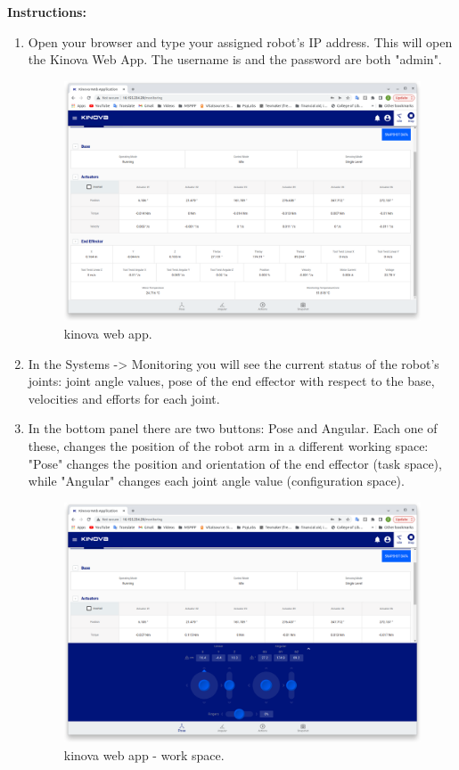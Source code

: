 \documentclass[12pt]{article}
\begin{document}
\textbf{Instructions:}
\begin{enumerate}
    \item Open your browser and type your assigned robot’s IP address. This will open the Kinova Web App. The username is and the password are both "admin". 
    \begin{figure}[H]
    \vspace{-10pt}
    \centering\includegraphics[width=12cm]{images/kinova1.PNG}\vspace{-10pt}
    \caption{kinova web app.}\label{fig:kinova1}
    \end{figure}
    
    \item In the Systems -> Monitoring you will see the current status of the robot’s joints: joint angle values, pose of the end effector with respect to the base, velocities and efforts for each joint.
    \item In the bottom panel there are two buttons: Pose and Angular. Each one of these, changes the position of the robot arm in a different working space: "Pose" changes the position and orientation of the end effector (task space), while "Angular" changes each joint angle value (configuration space).
    \begin{figure}[H]
    \vspace{-10pt}
    \centering\includegraphics[width=12cm]{images/kinova2.PNG}\vspace{-10pt}
    \caption{kinova web app - work space.}\label{fig:kinova2}
    \end{figure}
    

\end{enumerate}
\end{document}
